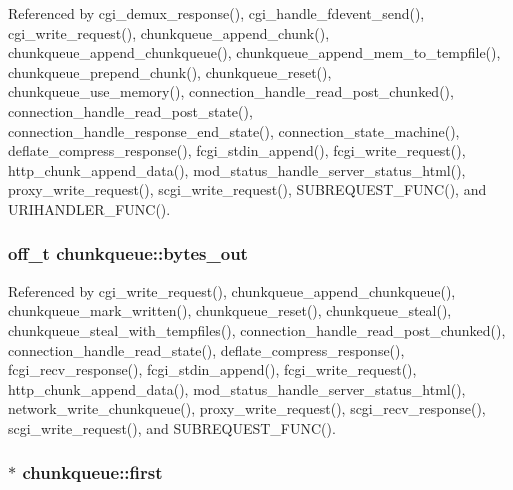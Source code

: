 Referenced by cgi\-\_\-demux\-\_\-response(), cgi\-\_\-handle\-\_\-fdevent\-\_\-send(), cgi\-\_\-write\-\_\-request(), chunkqueue\-\_\-append\-\_\-chunk(), chunkqueue\-\_\-append\-\_\-chunkqueue(), chunkqueue\-\_\-append\-\_\-mem\-\_\-to\-\_\-tempfile(), chunkqueue\-\_\-prepend\-\_\-chunk(), chunkqueue\-\_\-reset(), chunkqueue\-\_\-use\-\_\-memory(), connection\-\_\-handle\-\_\-read\-\_\-post\-\_\-chunked(), connection\-\_\-handle\-\_\-read\-\_\-post\-\_\-state(), connection\-\_\-handle\-\_\-response\-\_\-end\-\_\-state(), connection\-\_\-state\-\_\-machine(), deflate\-\_\-compress\-\_\-response(), fcgi\-\_\-stdin\-\_\-append(), fcgi\-\_\-write\-\_\-request(), http\-\_\-chunk\-\_\-append\-\_\-data(), mod\-\_\-status\-\_\-handle\-\_\-server\-\_\-status\-\_\-html(), proxy\-\_\-write\-\_\-request(), scgi\-\_\-write\-\_\-request(), S\-U\-B\-R\-E\-Q\-U\-E\-S\-T\-\_\-\-F\-U\-N\-C(), and U\-R\-I\-H\-A\-N\-D\-L\-E\-R\-\_\-\-F\-U\-N\-C().

\hypertarget{structchunkqueue_a48642cbb09f469f8eb25a325e630cfef}{
\subsubsection[{bytes\-\_\-out}]{\setlength{\rightskip}{0pt plus 5cm}off\-\_\-t chunkqueue\-::bytes\-\_\-out}}\label{structchunkqueue_a48642cbb09f469f8eb25a325e630cfef}


Referenced by cgi\-\_\-write\-\_\-request(), chunkqueue\-\_\-append\-\_\-chunkqueue(), chunkqueue\-\_\-mark\-\_\-written(), chunkqueue\-\_\-reset(), chunkqueue\-\_\-steal(), chunkqueue\-\_\-steal\-\_\-with\-\_\-tempfiles(), connection\-\_\-handle\-\_\-read\-\_\-post\-\_\-chunked(), connection\-\_\-handle\-\_\-read\-\_\-state(), deflate\-\_\-compress\-\_\-response(), fcgi\-\_\-recv\-\_\-response(), fcgi\-\_\-stdin\-\_\-append(), fcgi\-\_\-write\-\_\-request(), http\-\_\-chunk\-\_\-append\-\_\-data(), mod\-\_\-status\-\_\-handle\-\_\-server\-\_\-status\-\_\-html(), network\-\_\-write\-\_\-chunkqueue(), proxy\-\_\-write\-\_\-request(), scgi\-\_\-recv\-\_\-response(), scgi\-\_\-write\-\_\-request(), and S\-U\-B\-R\-E\-Q\-U\-E\-S\-T\-\_\-\-F\-U\-N\-C().

\hypertarget{structchunkqueue_ad6e42e51e2c86f6c50188fad0dd037ab}{
\subsubsection[{first}]{$\ast$ chunkqueue\-::first}}\label{structchunkqueue_ad6e42e51e2c86f6c50188fad0dd037ab}


